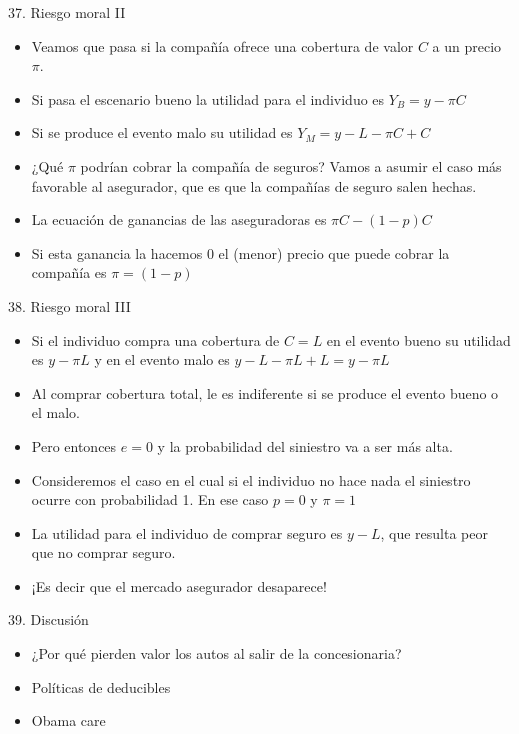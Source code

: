 \documentclass[14pt]{beamer}
\begin{document}
\begin{frame}{37. Riesgo moral II}
    \begin{itemize}
    \item Veamos que pasa si la compañía ofrece una cobertura de valor $C$ a un precio $\pi$. 
    \item Si pasa el escenario bueno la utilidad para el individuo es 
    $Y_B = y - \pi C$
    \item Si se produce el evento malo su utilidad es 
    $Y_M = y - L - \pi C + C$
    \item ¿Qué $\pi$ podrían cobrar la compañía de seguros? Vamos a asumir el caso más favorable al asegurador, que es que la compañías de seguro salen hechas. 
    \item La ecuación de ganancias de las aseguradoras es  
    $\pi C - (1-p) C$
    \item Si esta ganancia la hacemos $0$ el (menor) precio que puede cobrar la compañía es $\pi=(1-p)$
    \end{itemize}
\end{frame}

\begin{frame}{38. Riesgo moral III}
    \begin{itemize}
    \item Si el individuo compra una cobertura de $C=L$ en el evento bueno su utilidad es $y-\pi L$ y en el evento malo es $y-L-\pi L+L=y-\pi L $
    \item Al comprar cobertura total, le es indiferente si se produce el evento bueno o el malo. 
    \item Pero entonces $e=0$ y la probabilidad del siniestro va a ser más alta. 
    \item Consideremos el caso en el cual si el individuo no hace nada el siniestro ocurre con probabilidad 1. En ese caso $p=0$ y $\pi=1$
    \item La utilidad para el individuo de comprar seguro es $y-L$, que resulta peor que no comprar seguro. 
    \item ¡Es decir que el mercado asegurador desaparece! 
  \end{itemize}   
\end{frame}


\begin{frame}{39. Discusión}
    \begin{itemize}
        \item ¿Por qué pierden valor los autos al salir de la concesionaria?
        \item Políticas de deducibles
        \item Obama care
    \end{itemize}
\end{frame}
\end{document}
